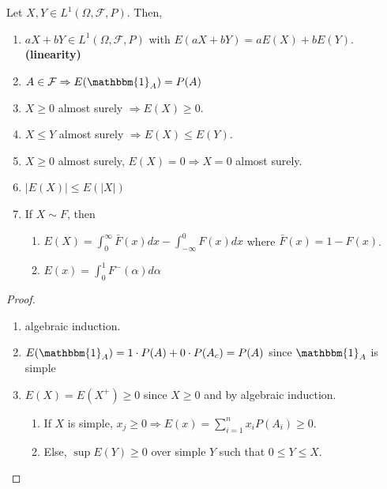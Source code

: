 \documentclass{article}
\begin{document}
		\begin{myprop}{}{}
			Let $X, Y\in L^1(\Omega, \mathcal{F}, P)$. Then,
			\begin{enumerate}
				\item $aX+bY\in L^1(\Omega, \mathcal{F}, P)$ with $E(aX+bY)=aE(X)+bE(Y)$. \textbf{(linearity)}
				
				\item $A\in\mathcal{F}\Rightarrow E(\mathbbm{1}_A)=P(A)$
				
				\item $X\geq0$ almost surely $\Rightarrow E(X)\geq0$.
				
				\item $X\leq Y$ almost surely $\Rightarrow E(X)\leq E(Y)$.
				
				\item $X\geq0$ almost surely, $E(X)=0\Rightarrow X=0$ almost surely.
				
				\item $|E(X)|\leq E(|X|)$
				
				\item If $X\sim F$, then
				\begin{enumerate}[label=(\roman*)]
					\item $E(X)=\int_0^{\infty}\bar{F}(x)dx-\int_{-\infty}^0F(x)dx$ where $\bar{F}(x)=1-F(x)$.
					
					\item $E(x)=\int_0^1F^-(\alpha)d\alpha$
				\end{enumerate}
			\end{enumerate}
			
			\begin{proof}~
				\begin{enumerate}
					\item algebraic induction.
					
					\item $E(\mathbbm{1}_A)=1\cdot P(A)+0\cdot P(A_c)=P(A)$ since $\mathbbm{1}_A$ is simple
					
					\item $E(X)=E(X^+)\geq0$ since $X\geq0$ and by algebraic induction.
					\begin{enumerate}[label=(\roman*)]
						\item If $X$ is simple, $x_j\geq0\Rightarrow E(x)=\sum_{i=1}^nx_iP(A_i)\geq0$.
						
						\item Else, $\sup E(Y)\geq0$ over simple $Y$ such that $0\leq Y\leq X$.
					\end{enumerate}
					

\end{enumerate}
\end{proof}
\end{myprop}
\end{document}
